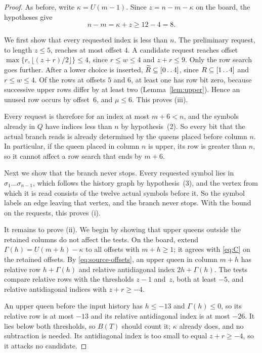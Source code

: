 \begin{proof}
As before, write $\kappa=U(m-1)$. Since $z=n-m-\kappa$ on the board,
the hypotheses give
\begin{equation}\label{eq:causality}
 n-m=\kappa+z\ge12-4=8.
\end{equation}

We first show that every requested index is less than $n$. The preliminary
request, to length $z\le5$, reaches at most offset
$4$. A candidate request reaches offset
$\max\{r,\lfloor(z+r)/2\rfloor\}\le4$, since $r\le w\le4$ and
$z+r\le9$. Only the row search goes further. After a lower choice is
inserted, $\widetilde R\subseteq[0\mathinner{\ldotp\ldotp}4]$, since $R\subseteq[1\mathinner{\ldotp\ldotp}4]$
and $r\le w\le4$. Of the rows at offsets $5$ and $6$, at least one
has row bit zero, because successive upper rows differ by at least
two (Lemma~\ref{lem:upper}). Hence an unused row occurs by
offset~$6$, and $\mu\le6$. This proves (iii).

Every request is therefore for an index at most $m+6<n$, and the
symbols already in $Q$ have indices less than $n$ by hypothesis~(2). So every bit that the actual branch reads is
already determined by the queens placed before column $n$. In
particular, if the queen placed in column $n$ is upper, its row is
greater than $n$, so it cannot affect a row search that ends by
$m+6$.

Next we show that the branch never stops. Every requested symbol lies in $\sigma_1\dots\sigma_{n-1}$, which
follows the history graph by hypothesis~(3), and the vertex from which
it is read consists of the twelve actual symbols before it. So the
symbol labels an edge leaving that vertex, and the branch never stops.
With the bound on the requests, this proves (i).

It remains to prove (ii). We begin by showing that upper queens outside the
retained columns do not affect the tests. On the board, extend $\Gamma(h)=U(m+h)-\kappa$ to all offsets with
$m+h\ge1$; it agrees with \eqref{eq:C} on the retained offsets. By
\eqref{eq:source-offsets}, an upper queen in column $m+h$ has
relative row $h+\Gamma(h)$ and relative antidiagonal index
$2h+\Gamma(h)$. The tests compare relative rows with the thresholds
$z-1$ and~$z$, both at least $-5$, and relative antidiagonal indices
with $z+r\ge-4$.

An upper queen before the input history has $h\le-13$ and
$\Gamma(h)\le0$, so its relative row is at most $-13$ and its
relative antidiagonal index is at most $-26$. It lies below both
thresholds, so $B(T)$ should count it; $\kappa$ already does, and no
subtraction is needed. Its antidiagonal index is too small to equal
$z+r\ge-4$, so it attacks no candidate.


\end{proof}

